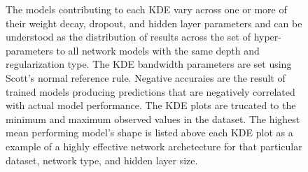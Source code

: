 \begin{figure}[htbp]
{             The models contributing to each KDE vary across one or more of their weight decay, dropout, and 
             hidden layer parameters and can be understood as the distribution of results across 
             the set of hyper-parameters to all network models with the same depth and regularization
             type. The KDE bandwidth parameters are set using Scott's normal reference rule. 
             Negative accuraies are the result of trained models producing predictions that 
             are negatively correlated with actual model performance. The KDE plots are 
             trucated to the minimum and maximum observed values in the dataset. The 
             highest mean performing model's shape is listed above each KDE plot as a 
             example of a highly effective network archetecture for that particular dataset, 
             network type, and hidden layer size.} 
\label{fig:depth-comparison}
\end{figure}


